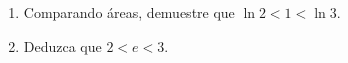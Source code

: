\item 
    \begin{enumerate}
        \item[(a)] Comparando áreas, demuestre que $\ln 2 < 1 < \ln 3$.
        \item[(b)] Deduzca que $2 < e < 3$.
    \end{enumerate}
